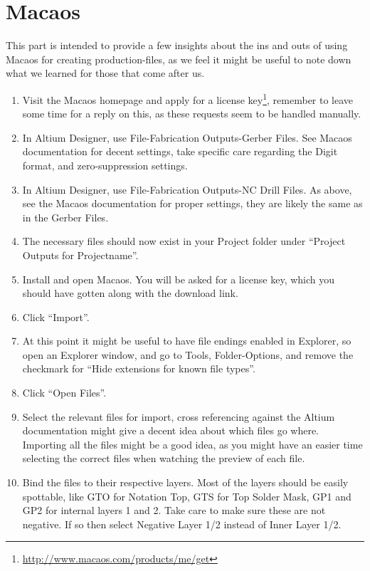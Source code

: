 \section{Macaos}\label{app:macaos}

This part is intended to provide a few insights about the ins and outs of using
Macaos for creating production-files, as we feel it might be useful to note down
what we learned for those that come after us.

\begin{enumerate}
\item Visit the Macaos homepage and apply for a license
  key\footnote{\url{http://www.macaos.com/products/me/get}}, remember to leave
  some time for a reply on this, as these requests seem to be handled manually.
\item In Altium Designer, use File-Fabrication Outputs-Gerber Files. See
  Macaos documentation for decent settings, take specific care regarding the
  Digit format, and zero-suppression settings.
\item In Altium Designer, use File-Fabrication Outputs-NC Drill Files. As above,
  see the Macaos documentation for proper settings, they are likely the same as
  in the Gerber Files.
\item The necessary files should now exist in your Project folder under
  ``Project Outputs for Projectname''.
\item Install and open Macaos. You will be asked for a license key, which you
  should have gotten along with the download link.
\item Click ``Import''.
\item At this point it might be useful to have file endings enabled in
  Explorer, so open an Explorer window, and go to Tools, Folder-Options, and
  remove the checkmark for ``Hide extensions for known file types''.
\item Click ``Open Files''.
\item Select the relevant files for import, cross referencing against the
  Altium documentation might give a decent idea about which files go where.
  Importing all the files might be a good idea, as you might have an easier time
  selecting the correct files when watching the preview of each file.
\item Bind the files to their respective layers. Most of the layers should be
  easily spottable, like GTO for Notation Top, GTS for Top Solder Mask, GP1 and
  GP2 for internal layers 1 and 2. Take care to make sure these are not
  negative. If so then select Negative Layer 1/2 instead of Inner Layer 1/2.

\end{enumerate}
